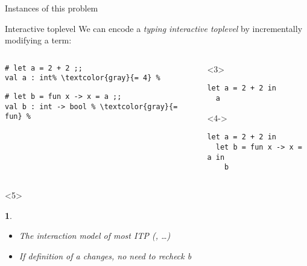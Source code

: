 \documentclass{beamer}
\theoremstyle{example}
\newtheorem{remarks}[theorem]{\translate{Remarks}}
\begin{document}
\begin{frame}[fragile]{Instances of this problem}
  \begin{block}{Interactive toplevel}
    We can encode a \emph{typing interactive toplevel} by
    incrementally modifying a term:
    \begin{overlayarea}{\textwidth}{10em}
    \begin{columns}
      \begin{column}{0.47\textwidth}
        \begin{lstlisting}[escapechar=\%]
# let a = 2 + 2 ;;
val a : int% \textcolor{gray}{= 4} %
        \end{lstlisting}
\pause
        \begin{lstlisting}[escapechar=\%]
# let b = fun x -> x = a ;;
val b : int -> bool % \textcolor{gray}{= fun} %
        \end{lstlisting}
      \end{column}
      \begin{column}{.1mm}
        \rule{.1mm}{3cm}
      \end{column}
      \begin{column}{0.44\textwidth}
        \begin{onlyenv}<3>
          \begin{lstlisting}
let a = 2 + 2 in
  a
          \end{lstlisting}
          \vspace{1.2em}
        \end{onlyenv}
        \begin{onlyenv}<4->
          \begin{lstlisting}
let a = 2 + 2 in
  let b = fun x -> x = a in
    b
          \end{lstlisting}
        \end{onlyenv}
      \end{column}
    \end{columns}
    \end{overlayarea}
    \begin{visibleenv}<5>
      \begin{remarks}
        \begin{itemize}
        \item The interaction model of most ITP (,
          \ldots)
        \item If definition of \textsf{a} changes, no need to recheck \textsf{b}
        \end{itemize}
      \end{remarks}
    \end{visibleenv}
  \end{block}
\end{frame}
\end{document}

